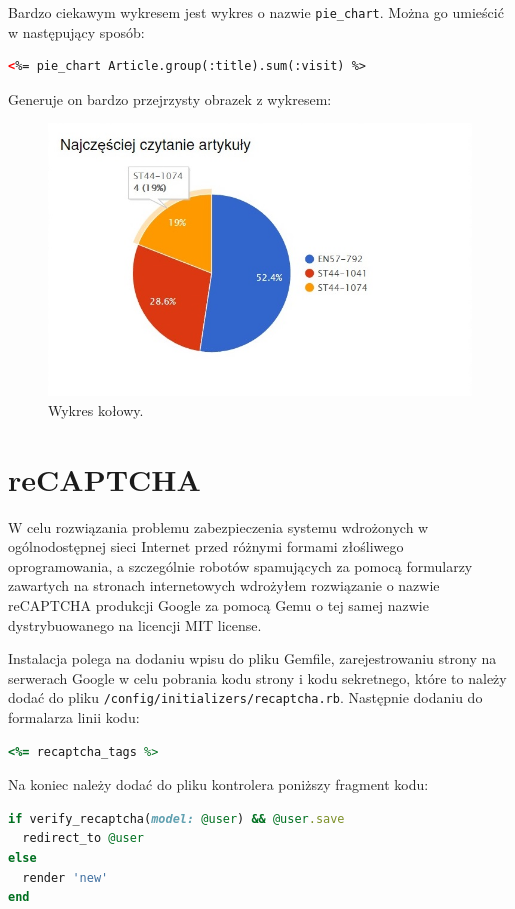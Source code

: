 \documentclass[openright]{xmgr}
\begin{document}
Bardzo ciekawym wykresem jest wykres o nazwie \texttt{pie\_chart}. Można go umieścić w następujący sposób:
\begin{lstlisting}[language=html, caption={Kod uruchamiający wykres kołowy}]
<%= pie_chart Article.group(:title).sum(:visit) %>
\end{lstlisting}
Generuje on bardzo przejrzysty obrazek z wykresem:
\begin{figure}[!tbh]
\centering
\includegraphics[width=.5\linewidth]{fig/chartkick}
\caption{Wykres kołowy.}
\end{figure}

\section{reCAPTCHA}

W celu rozwiązania problemu zabezpieczenia systemu wdrożonych w ogólnodostępnej sieci Internet przed różnymi formami złośliwego oprogramowania, a szczególnie robotów spamujących za pomocą formularzy zawartych na stronach internetowych wdrożyłem rozwiązanie o nazwie reCAPTCHA produkcji Google za pomocą Gemu o tej samej nazwie \cite{recaptcha} dystrybuowanego na licencji MIT license. 

\newpage

Instalacja polega na dodaniu wpisu do pliku Gemfile, zarejestrowaniu strony na serwerach Google w celu pobrania kodu strony i kodu sekretnego, które to należy dodać do pliku \texttt{/config/initializers/recaptcha.rb}. Następnie dodaniu do formalarza linii kodu:
\begin{lstlisting}[language=ruby, caption={Kod wyświetlający formularz reCAPTCHA}]
<%= recaptcha_tags %> 
\end{lstlisting}
Na koniec należy dodać do pliku kontrolera poniższy fragment kodu: 
\begin{lstlisting}[language=ruby, caption={Kod kontrolera weryfikujący reCAPTCHA}]
if verify_recaptcha(model: @user) && @user.save
  redirect_to @user
else
  render 'new'
end
\end{lstlisting}
\end{document}
